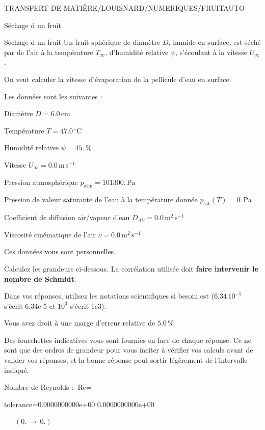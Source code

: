 \documentclass[12pt]{article}
\begin{document}
\begin{quiz}{TRANSFERT DE MATIÈRE/LOUISNARD/NUMERIQUES/FRUITAUTO}
\begin{cloze}{Séchage d un fruit}
\end{cloze} 


 \begin{cloze}{Séchage d un fruit} 
Un fruit sphérique de diamètre $D$, humide en surface, est séché par de l'air à la température $T_\infty$, d'humidité relative $\psi$, s'écoulant à la vitesse $U_\infty$.

On veut calculer la vitesse d'évaporation de la pellicule d'eau en surface.

 

Les données sont les suivantes :

 

Diamètre $D = 6.0\,  \mathrm{cm} $

Température $T = 47.0\,  \mathrm{^\circ\mathrm{C}} $

Humidité relative $\psi = 45.\, \% $

Vitesse $U_\infty = 0.0\,  \mathrm{m}\,  \mathrm{s}^{-1} $

Pression atmosphérique $p_{\text{atm}} = 101300.\,  \mathrm{Pa} $

Pression de valeur saturante de l’eau à la température donnée $p_{\text{sat}}(T) = 0.\,  \mathrm{Pa} $

Coefficient de diffusion air/vapeur d’eau $D_{AV} = 0.0\,  \mathrm{m}^{2}\,  \mathrm{s}^{-1} $

Viscosité cinématique de l’air $\nu = 0.0\,  \mathrm{m}^{2}\,  \mathrm{s}^{-1} $

Ces données vous sont personnelles.

 

Calculez les grandeurs ci-dessous. La corrélation utilisée doit \textbf{faire intervenir le nombre de Schmidt}.

Dans vos réponses, utilisez les notations scientifiques si besoin est ($6.34\, 10^{-5}$ s'écrit 6.34e-5 et $10^{3}$ s'écrit 1e3).

Vous avez droit à une marge d'erreur relative de $5.0\, \% $

Des fourchettes indicatives vous sont fournies en face de chaque réponse. Ce ne sont que des ordres de grandeur pour vous inciter à vérifier vos calculs avant de valider vos réponses, et la bonne réponse peut sortir légèrement de l'intervalle indiqué.

 

Nombre de Reynolds : $\text{Re} =  $
\begin{numerical}[points=1] 
\item[tolerance={0.0000000000e+00}] 0.0000000000e+00 
\end{numerical} 
 $\,$ 
 $ \quad (0. \, \rightarrow \, 0.) $ 


\end{cloze}
\end{quiz}
\end{document}
